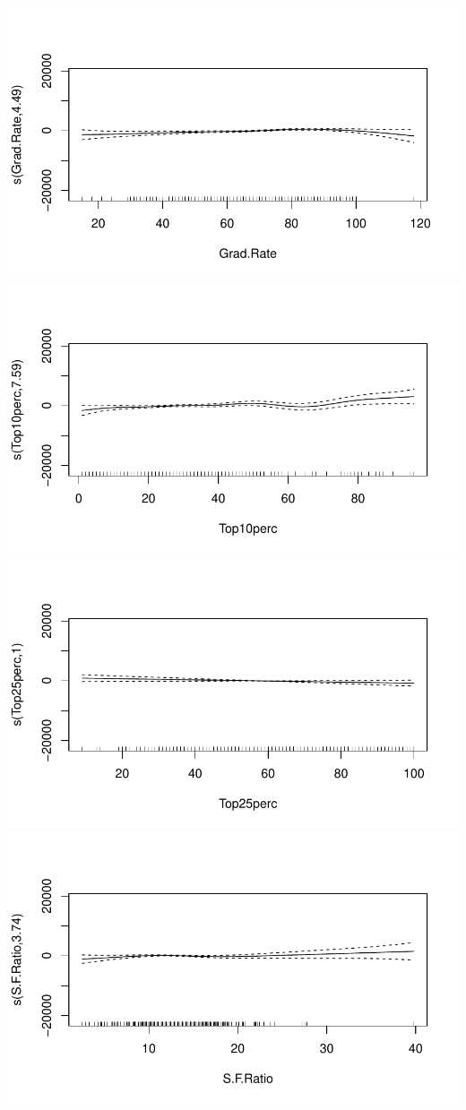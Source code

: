 \documentclass[
]{article}
\begin{document}
\includegraphics[width=0.9\linewidth]{HW2_co2554_files/figure-latex/GAM-5}
\includegraphics[width=0.9\linewidth]{HW2_co2554_files/figure-latex/GAM-6}
\includegraphics[width=0.9\linewidth]{HW2_co2554_files/figure-latex/GAM-7}
\includegraphics[width=0.9\linewidth]{HW2_co2554_files/figure-latex/GAM-8}
\end{document}
